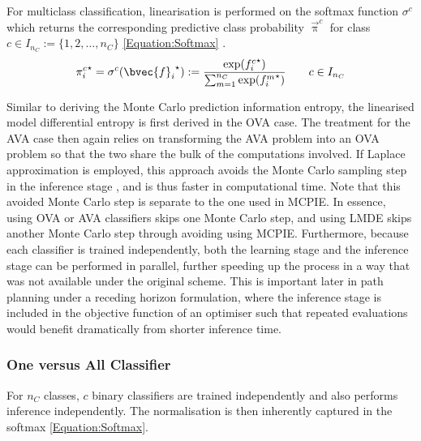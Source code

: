 			For multiclass classification, linearisation is performed on the softmax function $\sigma^{c}$ which returns the corresponding predictive class probability $\vec{\uppi}^{c}$ for class $c \in I_{n_{C}} := \{1, 2, \dots, n_{C}\}$ \eqref{Equation:Softmax} \citep{GaussianProcessForMachineLearning}. \begin{equation}
				{\pi^{c}_{i}}^{\star} = \sigma^{c}({\bvec{f}_{i}}^{\star}) := \frac{\exp({f^{c}_{i}}^{\star})}{\sum_{m = 1}^{n_{C}} \exp({f^{m}_{i}}^{\star})} \qquad c \in I_{n_{C}}
			\label{Equation:Softmax}
			\end{equation}
			
			Similar to deriving the Monte Carlo prediction information entropy, the linearised model differential entropy is first derived in the OVA case. The treatment for the AVA case then again relies on transforming the AVA problem into an OVA problem so that the two share the bulk of the computations involved. If Laplace approximation is employed, this approach avoids the Monte Carlo sampling step in the inference stage \citep{GaussianProcessForMachineLearning}, and is thus faster in computational time. Note that this avoided Monte Carlo step is separate to the one used in MCPIE. In essence, using OVA or AVA classifiers skips one Monte Carlo step, and using LMDE skips another Monte Carlo step through avoiding using MCPIE. Furthermore, because each classifier is trained independently, both the learning stage and the inference stage can be performed in parallel, further speeding up the process in a way that was not available under the original scheme. This is important later in path planning under a receding horizon formulation, where the inference stage is included in the objective function of an optimiser such that repeated evaluations would benefit dramatically from shorter inference time.
			
			\subsubsection{One versus All Classifier}
			\label{InformativeSeafloorExploration:LMDE:Multiclass:OVA}
			
				For $n_{C}$ classes, $c$ binary classifiers are trained independently and also performs inference independently. The normalisation is then inherently captured in the softmax \eqref{Equation:Softmax}. 
				
